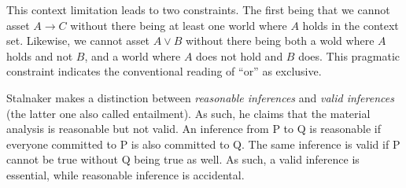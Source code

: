 \documentclass[12pt]{report}
\begin{document}
This context limitation leads to two constraints. The first being that we cannot
asset $A \rightarrow C$ without there being at least one world where $A$ holds
in the context set. Likewise, we cannot asset $A \lor B$ without there being
both a wold where $A$ holds and not $B$, and a world where $A$ does not hold and
$B$ does. This pragmatic constraint indicates the conventional reading of ``or''
as exclusive.

Stalnaker makes a distinction between \textit{reasonable inferences} and
\textit{valid inferences} (the latter one also called entailment). As such, he
claims that the material analysis is reasonable but not valid. An inference from
P to Q is reasonable if everyone committed to P is also committed to Q. The same
inference is valid if P cannot be true without Q being true as well. As such, a
valid inference is essential, while reasonable inference is accidental.
\end{document}
